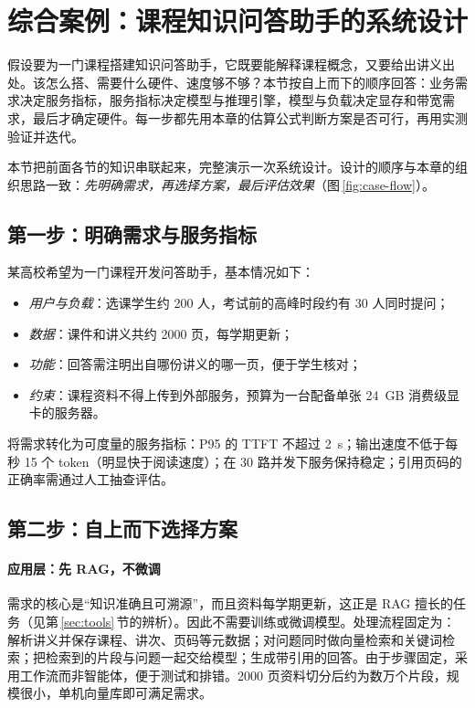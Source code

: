 \section{综合案例：课程知识问答助手的系统设计}
\label{sec:case}

\begin{guide}
\noindent 假设要为一门课程搭建知识问答助手，它既要能解释课程概念，又要给出讲义出处。该怎么搭、需要什么硬件、速度够不够？本节按自上而下的顺序回答：业务需求决定服务指标，服务指标决定模型与推理引擎，模型与负载决定显存和带宽需求，最后才确定硬件。每一步都先用本章的估算公式判断方案是否可行，再用实测验证并迭代。
\end{guide}

本节把前面各节的知识串联起来，完整演示一次系统设计。设计的顺序与本章的组织思路一致：\emph{先明确需求，再选择方案，最后评估效果}（图\,\ref{fig:case-flow}）。



\subsection{第一步：明确需求与服务指标}

某高校希望为一门课程开发问答助手，基本情况如下：
\begin{itemize}
  \item \emph{用户与负载}：选课学生约 200 人，考试前的高峰时段约有 30 人同时提问；
  \item \emph{数据}：课件和讲义共约 2000 页，每学期更新；
  \item \emph{功能}：回答需注明出自哪份讲义的哪一页，便于学生核对；
  \item \emph{约束}：课程资料不得上传到外部服务，预算为一台配备单张 \SI{24}{GB} 消费级显卡的服务器。
\end{itemize}

将需求转化为可度量的服务指标：P95 的 TTFT 不超过 \SI{2}{s}；输出速度不低于每秒 15 个 token（明显快于阅读速度）；在 30 路并发下服务保持稳定；引用页码的正确率需通过人工抽查评估。

\subsection{第二步：自上而下选择方案}

\paragraph{应用层：先 RAG，不微调} 需求的核心是“知识准确且可溯源”，而且资料每学期更新，这正是 RAG 擅长的任务（见第\,\ref{sec:tools}\,节的辨析）。因此不需要训练或微调模型。处理流程固定为：解析讲义并保存课程、讲次、页码等元数据；对问题同时做向量检索和关键词检索；把检索到的片段与问题一起交给模型；生成带引用的回答。由于步骤固定，采用工作流而非智能体，便于测试和排错。2000 页资料切分后约为数万个片段，规模很小，单机向量库即可满足需求。

